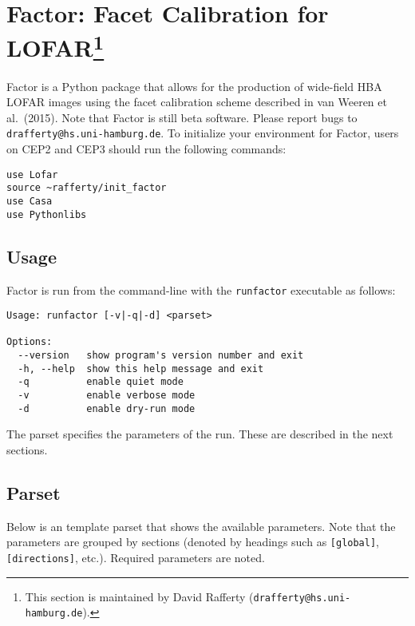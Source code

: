 \documentclass[structabstract]{article}
\begin{document}

\section[Factor: Facet Calibration for LOFAR]{Factor: Facet Calibration for
LOFAR\footnote{This section is maintained by David Rafferty
({\tt drafferty@hs.uni-hamburg.de}).}}
\label{factor}

Factor is a Python package that allows for the production of wide-field HBA
LOFAR images using the facet calibration scheme described in van Weeren et al.\
(2015). Note that Factor is still beta software. Please report bugs to
{\tt drafferty@hs.uni-hamburg.de}. To initialize your environment for Factor,
users on CEP2 and CEP3 should run the following commands:
\begin{verbatim}
use Lofar
source ~rafferty/init_factor
use Casa
use Pythonlibs
\end{verbatim}

\subsection{Usage}
\label{factor:usage}

Factor is run from the command-line with the {\tt runfactor} executable as
follows:
\begin{verbatim}
Usage: runfactor [-v|-q|-d] <parset>

Options:
  --version   show program's version number and exit
  -h, --help  show this help message and exit
  -q          enable quiet mode
  -v          enable verbose mode
  -d          enable dry-run mode
\end{verbatim}
The parset specifies the parameters of the run. These are described in the next
sections.

\subsection{Parset}
\label{factor:parset}

Below is an template parset that shows the available parameters. Note that the
parameters are grouped by sections (denoted by headings such as {\tt [global]},
{\tt [directions]}, etc.). Required parameters are noted.
\end{document}
